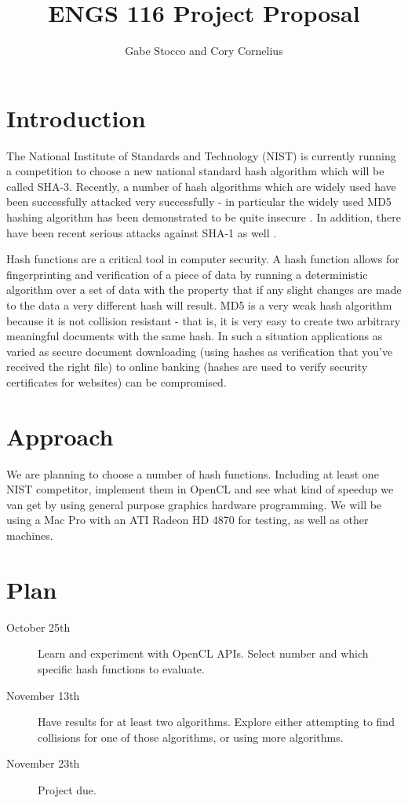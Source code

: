 \documentclass{article}
\title{ENGS 116 Project Proposal}
\author{Gabe Stocco and Cory Cornelius}
\begin{document}
\maketitle

\section{Introduction}
The National Institute of Standards and Technology (NIST) is currently running a competition to choose a new national standard hash algorithm which will be called SHA-3.
Recently, a number of hash algorithms which are widely used have been successfully attacked very successfully - in particular the widely used MD5 hashing algorithm has been demonstrated to be quite insecure \cite{Nostradamus}.
In addition, there have been recent serious attacks against SHA-1 as well \cite{Sha1Collisions}.

Hash functions are a critical tool in computer security.
A hash function allows for fingerprinting and verification of a piece of data by running a deterministic algorithm over a set of data with the property that if any slight changes are made to the data a very different hash will result.
MD5 is a very weak hash algorithm because it is not collision resistant - that is, it is very easy to create two arbitrary meaningful documents with the same hash.
In such a situation applications as varied as secure document downloading (using hashes as verification that you've received the right file) to online banking (hashes are used to verify security certificates for websites) can be compromised.


\section{Approach}
We are planning to choose a number of hash functions.
Including at least one NIST competitor, implement them in OpenCL and see what kind of speedup we van get by using general purpose graphics hardware programming.
We will be using a Mac Pro with an ATI Radeon HD 4870 for testing, as well as other machines.


\section{Plan}
\begin{description}
  \item[October 25th] Learn and experiment with OpenCL APIs. Select number and which specific hash functions to evaluate.
  \item[November 13th] Have results for at least two algorithms. Explore either attempting to find collisions for one of those algorithms, or using more algorithms.
  \item[November 23th] Project due.
\end{description}
\end{document}
